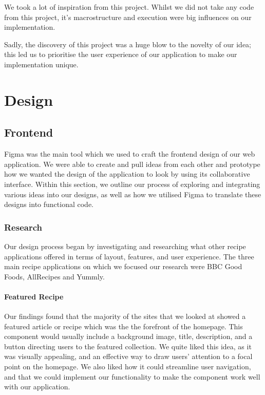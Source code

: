 \documentclass{article}
\begin{document}
We took a lot of inspiration from this project. Whilst we did not take any code from this project, it's macrostructure and execution were big influences on our implementation.

Sadly, the discovery of this project was a huge blow to the novelty of our idea; this led us to prioritise the user experience of our application to make our implementation unique.


\section{Design}
\subsection{Frontend}
Figma was the main tool which we used to craft the frontend design of our web application. We were able to create and pull ideas from each other and prototype how we wanted the design of the application to look by using its collaborative interface. Within this section, we outline our process of exploring and integrating various ideas into our designs, as well as how we utilised Figma to translate these designs into functional code.

\subsubsection{Research}

Our design process began by investigating and researching what other recipe applications offered in terms of layout, features, and user experience. The three main recipe applications on which we focused our research were BBC Good Foods, AllRecipes and Yummly.

\paragraph{Featured Recipe}
Our findings found that the majority of the sites that we looked at showed a featured article or recipe which was the the forefront of the homepage. This component would usually include a background image, title, description, and a button directing users to the featured collection. We quite liked this idea, as it was visually appealing, and an effective way to draw users' attention to a focal point on the homepage. We also liked how it could streamline user navigation, and that we could implement our functionality to make the component work well with our application.
\end{document}
